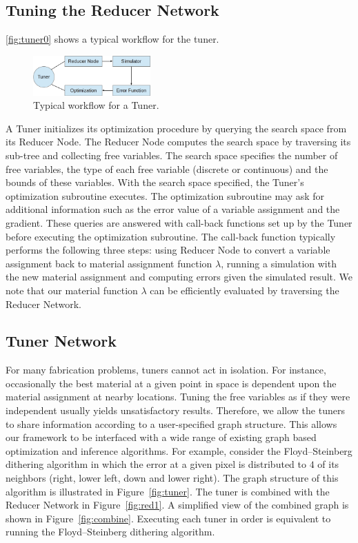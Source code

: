 \documentclass[annual]{acmsiggraph}
\begin{document}
\subsection{Tuning the Reducer Network}
\autoref{fig:tuner0} shows a typical workflow for the tuner.
\begin{figure}
\includegraphics[width=0.4\textwidth]{figure/tuner0.png}
\caption{Typical workflow for a Tuner.}
\label{fig:tuner0}
\end{figure}
A Tuner initializes its optimization procedure by querying the search space from its Reducer Node.
The Reducer Node computes the search space by traversing its sub-tree and collecting
free variables. The search space specifies the number of free variables, the type of each free variable
(discrete or continuous) and the bounds of these variables.
With the search space specified, the Tuner's optimization subroutine executes.
The optimization subroutine may ask for additional information such as
the error value of a variable assignment and the gradient. These queries are answered
with call-back functions set up by the Tuner before executing the optimization subroutine.
The call-back function typically performs the following three steps:
using Reducer Node to convert a variable assignment back to material assignment
function $\lambda$, running a simulation with the new material assignment
and computing errors given the simulated result.
We note that our material function $\lambda$ can
be efficiently evaluated by traversing the Reducer Network.
\subsection{Tuner Network}
For many fabrication problems, tuners cannot act in isolation. For instance,  occasionally the best material at a given point in space is dependent upon the material assignment at nearby locations.  Tuning the free variables as if they were independent usually yields unsatisfactory results. Therefore, we allow the tuners to share information according to a user-specified graph structure.  This allows our framework to be interfaced with a wide range of existing graph based optimization and inference algorithms. For example, consider the Floyd–Steinberg dithering algorithm in which the error at a given pixel is distributed
to $4$ of its neighbors (right, lower left, down and lower right).  The graph structure of this algorithm is illustrated in Figure~\ref{fig:tuner}. The tuner is combined with the Reducer Network in Figure~\ref{fig:red1}. A simplified view of the combined graph is shown in Figure~\ref{fig:combine}. Executing each tuner in order is equivalent to running the Floyd–Steinberg dithering algorithm.
\end{document}
